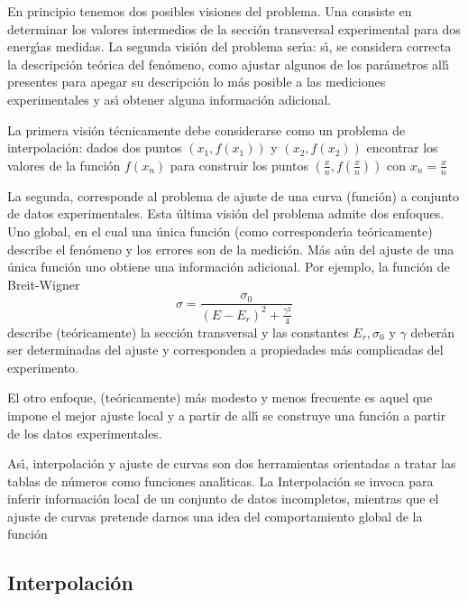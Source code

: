 \documentclass[spanish,titlepage,11pt]{article}
\begin{document}
En principio tenemos dos posibles visiones del problema. Una consiste en
determinar los valores intermedios de la secci\'{o}n transversal experimental
para dos energ\'{\i}as medidas. La segunda visi\'{o}n del problema ser\'{\i}a:
s\'{\i}, se considera correcta la descripci\'{o}n te\'{o}rica del
fen\'{o}meno, como ajustar algunos de los par\'{a}metros all\'{\i} presentes
para apegar su descripci\'{o}n lo m\'{a}s posible a las mediciones
experimentales y as\'{\i} obtener alguna informaci\'{o}n adicional.

La primera visi\'{o}n t\'{e}cnicamente debe considerarse como un problema de
interpolaci\'{o}n: dados dos puntos $\left(  x_{1},f(x_{1})\right)  $ y
$\left(  x_{2},f(x_{2})\right)  $ encontrar los valores de la funci\'{o}n
$f(x_{n})$ para construir los puntos $\left(  \frac{x}{n},f\left(  \frac{x}%
{n}\right)  \right)  $ con $x_{n}=\frac{x}{n}$

La segunda, corresponde al problema de ajuste de una curva (funci\'{o}n) a
conjunto de datos experimentales. Esta \'{u}ltima visi\'{o}n del problema
admite dos enfoques. Uno global, en el cual una \'{u}nica funci\'{o}n (como
corresponder\'{\i}a te\'{o}ricamente) describe el fen\'{o}meno y los errores
son de la medici\'{o}n. M\'{a}s a\'{u}n del ajuste de una \'{u}nica
funci\'{o}n uno obtiene una informaci\'{o}n adicional. Por ejemplo, la
funci\'{o}n de Breit-Wigner
\begin{equation}
\sigma=\frac{\sigma_{0}}{\left(  E-E_{r}\right)  ^{2}+\frac{\gamma^{2}}{4}}%
\end{equation}
describe (te\'{o}ricamente) la secci\'{o}n transversal y las constantes
$E_{r},\sigma_{0}$ y $\gamma$ deber\'{a}n ser determinadas del ajuste y
corresponden a propiedades m\'{a}s complicadas del experimento.

El otro enfoque, (te\'{o}ricamente) m\'{a}s modesto y menos frecuente es aquel
que impone el mejor ajuste local y a partir de all\'{\i} se construye una
funci\'{o}n a partir de los datos experimentales.

As\'{\i}, interpolaci\'{o}n y ajuste de curvas son dos herramientas orientadas
a tratar las tablas de n\'{u}meros como funciones anal\'{\i}ticas. La
Interpolaci\'{o}n se invoca para inferir informaci\'{o}n local de un conjunto
de datos incompletos, mientras que el ajuste de curvas pretende darnos una
idea del comportamiento global de la funci\'{o}n

\subsection{Interpolaci\'{o}n}
\end{document}
